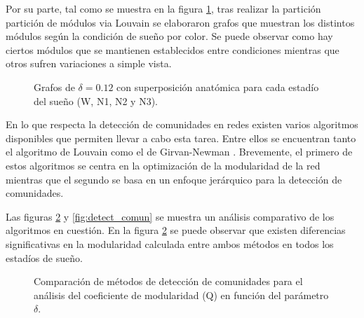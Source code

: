 \documentclass{article}
\begin{document}
Por su parte, tal como se muestra en la figura \ref{fig:superp_w_n1_n2_n3}, tras realizar la partición partición de módulos via Louvain se elaboraron grafos que muestran los distintos módulos según la condición de sueño por color. Se puede observar como hay ciertos módulos que se mantienen establecidos entre condiciones mientras que otros sufren variaciones a simple vista.

\begin{figure}[H]
    \centering
    \hfill
    \hfill
    \hfill
    \hfill
    \caption[]{Grafos de $\delta=0.12$ con superposición anatómica para cada estadío del sueño (W, N1, N2 y N3). \footnotemark }
    \label{fig:superp_w_n1_n2_n3}
\end{figure}

En lo que respecta la detección de comunidades en redes existen varios algoritmos disponibles que permiten llevar a cabo esta tarea. Entre ellos se encuentran tanto el algoritmo de Louvain \cite{Traag_2019} como el de Girvan-Newman \cite{Newman_2004}. Brevemente, el primero de estos algoritmos se centra en la optimización de la modularidad de la red mientras que el segundo se basa en un enfoque jerárquico para la detección de comunidades.

Las figuras \ref{fig:q_vs_delta} y \ref{fig:detect_comun} se muestra un análisis comparativo de los algoritmos en cuestión. En la figura \ref{fig:q_vs_delta} se puede observar que existen diferencias significativas en la modularidad calculada entre ambos métodos en todos los estadíos de sueño.

\begin{figure}[H]
    \centering
    \hfill
    \hfill
    \hfill
    \hfill
    \caption[]{Comparación de métodos de detección de comunidades para el análisis del coeficiente de modularidad (Q) en función del parámetro $\delta$. \footnotemark}
    \label{fig:q_vs_delta}
\end{figure}
\end{document}
